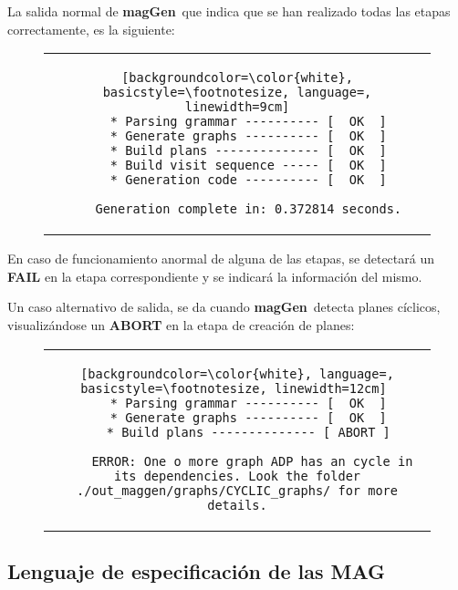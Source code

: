 \documentclass[runningheads,a4paper]{llncs}
\newcommand{\maggen}{\textbf{magGen}}
\begin{document}
La salida normal de \maggen\ que indica que se han realizado todas las etapas correctamente, es la siguiente:

\vspace{-0.5cm}
\begin{figure}[h]
\begin{center}
\begin{tabular}{c}
\begin{lstlisting}[backgroundcolor=\color{white}, basicstyle=\footnotesize, language=, linewidth=9cm]
   * Parsing grammar ---------- [  OK  ]
   * Generate graphs ---------- [  OK  ]
   * Build plans -------------- [  OK  ]
   * Build visit sequence ----- [  OK  ]
   * Generation code ---------- [  OK  ]

   Generation complete in: 0.372814 seconds.
\end{lstlisting}
\end{tabular}
\end{center}
\end{figure}
\vspace{-0.9cm}

En caso de funcionamiento anormal de alguna de las etapas, se detectará un \textbf{FAIL} en la etapa correspondiente y se indicará la información del mismo.

Un caso alternativo de salida, se da cuando \maggen\ detecta planes cíclicos, visualizándose un \textbf{ABORT} en la etapa de creación de planes:

\vspace{-0.5cm}
\begin{figure}[h]
\begin{center}
\begin{tabular}{c}
\begin{lstlisting}[backgroundcolor=\color{white}, language=, basicstyle=\footnotesize, linewidth=12cm] 
   * Parsing grammar ---------- [  OK  ]
   * Generate graphs ---------- [  OK  ]
   * Build plans -------------- [ ABORT ]

    ERROR: One o more graph ADP has an cycle in its dependencies. Look the folder ./out_maggen/graphs/CYCLIC_graphs/ for more details.
\end{lstlisting}
\end{tabular}
\end{center}
\end{figure}
\vspace{-0.9cm}

\subsection{Lenguaje de especificación de las MAG}
\label{sec:lenguajeMAG}
\end{document}
